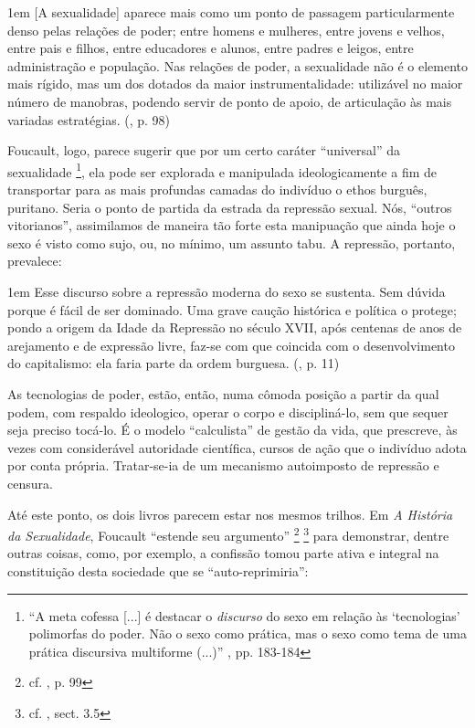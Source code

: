 \documentclass[12pt,a4paper]{article}
\newenvironment{citac}
{
	\begin{addmargin}
		[4cm]{1em} \footnotesize}{\normalfont 
	\end{addmargin}
}
\begin{document}
	\begin{citac}
		[A sexualidade] aparece mais como um ponto de passagem particularmente 
		denso pelas relações de poder; entre homens e mulheres, entre jovens e 
		velhos, entre pais e filhos, entre educadores e alunos, entre padres e 
		leigos, entre administração e população. Nas relações de poder, a 
		sexualidade não é o elemento mais rígido, mas um dos dotados da maior 
		instrumentalidade: utilizável no maior número de manobras, podendo 
		servir de ponto de apoio, de articulação às mais variadas estratégias. 
		(\cite{hs}, p. 98)
	\end{citac}
	
	Foucault, logo, parece sugerir que por um certo caráter ``universal'' da 
	sexualidade
	\footnote{``A meta cofessa [...] é destacar o \textit{discurso} do sexo 
	em relação às `tecnologias' polimorfas do poder. Não o sexo como prática, 
	mas o sexo como tema de uma prática discursiva multiforme (...)'' 
	\cite{merquior}, pp. 183-184}, 
	ela pode ser explorada e manipulada ideologicamente a fim de 
	transportar para as mais profundas camadas do indivíduo o ethos burguês, 
	puritano. Seria o ponto de partida da estrada da repressão sexual. Nós, 
	``outros vitorianos'', assimilamos de maneira tão forte esta manipuação 
	que ainda hoje o sexo é visto como sujo, ou, no mínimo, um assunto tabu. 
	A repressão, portanto, prevalece: 
	
	\begin{citac}
		Esse discurso sobre a repressão moderna do sexo se sustenta. Sem 
		dúvida porque é fácil de ser dominado. Uma grave caução histórica e 
		política o protege; pondo a origem da Idade da Repressão no século 
		XVII, após centenas de anos de arejamento e de expressão livre, 
		faz-se com que coincida com o desenvolvimento do capitalismo: ela 
		faria parte da ordem burguesa. 
		(\cite{hs}, p. 11)
	\end{citac}
	
	As tecnologias de poder, estão, então, numa cômoda posição a partir da 
	qual podem, com respaldo ideologico, operar o corpo e discipliná-lo, 
	sem que sequer seja preciso tocá-lo. É o modelo ``calculista'' de gestão 
	da vida, que prescreve, às vezes com considerável autoridade científica, 
	cursos de ação que o indivíduo adota por conta própria. Tratar-se-ia de 
	um mecanismo autoimposto de repressão e censura. 
	
	Até este ponto, os dois livros parecem estar nos mesmos trilhos. Em 
	\textit{A História da Sexualidade}, Foucault ``estende seu argumento''
		\footnote{cf. \cite{pwkn}, p. 99} 
		\footnote{cf. \cite{sep}, sect. 3.5}
	para demonstrar, dentre outras coisas, como, por exemplo, a confissão 
	tomou parte ativa e integral na constituição desta sociedade que se 
	``auto-reprimiria'': 
	
\end{document}

